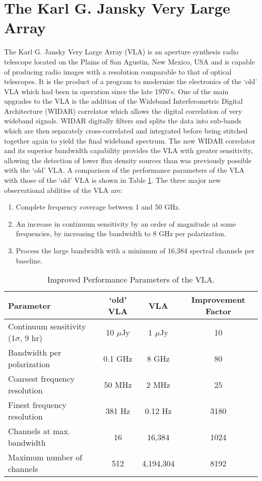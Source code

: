 \section{The Karl G. Jansky Very Large Array}\label{sec:3.5}
The Karl G. Jansky Very Large Array (VLA) is an aperture synthesis radio telescope located on the Plains of San Agustin, New Mexico, USA and is capable of producing radio images with a resolution comparable to that of optical telescopes. It is the product of a program to modernize the electronics of the `old' VLA which had been in operation since the late 1970's. One of the main upgrades to the VLA is the addition of the Wideband Interferometric Digital Architecture (WIDAR) correlator which allows the digital correlation of very wideband signals. WIDAR digitally filters and splits the data into sub-bands which are then separately cross-correlated and integrated before being stitched together again to yield the final wideband spectrum. The new WIDAR correlator and its superior bandwidth capability provides the VLA with greater sensitivity, allowing the detection of lower flux density sources than was previously possible with the `old' VLA. A comparison of the performance parameters of the VLA with those of the `old' VLA is shown in Table \ref{tab:3.1}. The three major new observational abilities of the VLA are:
\begin{enumerate}
\item Complete frequency coverage between 1 and 50 GHz.
\item An increase in continuum sensitivity by an order of magnitude at some frequencies, by increasing the bandwidth to 8 GHz per polarization.
\item Process the large bandwidth with a minimum of 16,384 spectral channels per baseline.
\end{enumerate}

\begin{table}
\begin{center}
\caption[Improved Performance Parameters of the VLA.]
{Improved Performance Parameters of the VLA.}
\begin{tabular}{lccc}
\hline
\hline
\rule{0pt}{2.5ex}Parameter & `old' VLA & VLA & Improvement Factor \\
\hline
\rule{0pt}{2.5ex}Continuum sensitivity (1$\sigma$, 9 hr) & 10 $\mu$Jy & 1 $\mu$Jy& 10\\
Bandwidth per polarization & 0.1 GHz & 8 GHz & 80\\ 
Coarsest frequency resolution & 50 MHz & 2 MHz & 25\\ 
Finest frequency resolution & 381 Hz & 0.12 Hz & 3180\\ 
Channels at max. bandwidth & 16 & 16,384 & 1024\\ 
Maximum number of channels & 512 & 4,194,304 & 8192\\ 
\hline
\end{tabular}
\label{tab:3.1}
\end{center}
\end{table}

